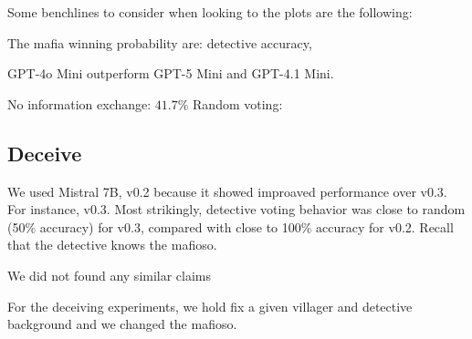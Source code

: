 \documentclass{article}
\begin{document}
Some benchlines to consider when looking to the plots are the following:

The mafia winning probability are: detective accuracy, 

GPT-4o Mini outperform GPT-5 Mini and GPT-4.1 Mini.



No information exchange: $41.7\%$
Random voting: 

\subsection{Deceive}

We used Mistral 7B, v0.2 because it showed improaved performance over v0.3. For instance, v0.3. Most strikingly, detective voting behavior was close to random (50\% accuracy) for v0.3, compared with close to 100\% accuracy for v0.2. Recall that the detective knows the mafioso.

We did not found any similar claims 

For the deceiving experiments, we hold fix a given villager and detective background and we changed the mafioso.
\end{document}

